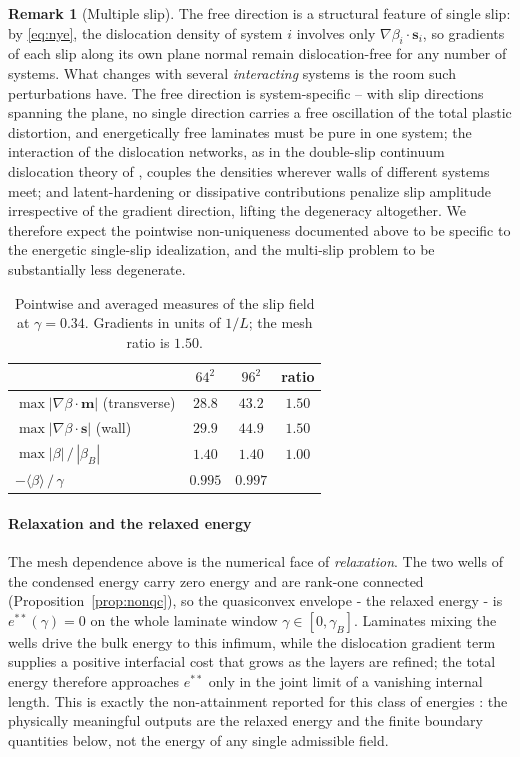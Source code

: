 \documentclass[12pt]{article}
\theoremstyle{plain}
\theoremstyle{definition}
\newtheorem{remark}[theorem]{Remark}
\newcommand{\bs}{\bm{s}}
\newcommand{\bmm}{\bm{m}}
\begin{document}
\begin{remark}[Multiple slip]
The free direction is a structural feature of single slip: by \eqref{eq:nye}, the
dislocation density of system $i$ involves only $\nabla\beta_i\cdot\bs_i$, so
gradients of each slip along its own plane normal remain dislocation-free for
any number of systems. What changes with several \emph{interacting} systems
is the room such perturbations have. The free direction is system-specific --
with slip directions spanning the plane, no single direction carries a free
oscillation of the total plastic distortion, and energetically free laminates
must be pure in one system; the interaction of the dislocation networks, as
in the double-slip continuum dislocation theory of \citet{le2008plane,le2009plane}, couples the densities wherever walls of different systems meet;
and latent-hardening or dissipative contributions penalize slip amplitude
irrespective of the gradient direction, lifting the degeneracy altogether. We
therefore expect the pointwise non-uniqueness documented above to be specific
to the energetic single-slip idealization, and the multi-slip problem to be
substantially less degenerate.
\end{remark}

\begin{table}[h]\centering\small
\caption{Pointwise and averaged measures of the slip field at $\gamma=0.34$.
Gradients in units of $1/L$; the mesh ratio is $1.50$.}
\label{tab:res-pointwise}
\begin{tabular}{lccc}
\hline
 & $64^2$ & $96^2$ & ratio \\
\hline
$\max|\nabla\beta\cdot\bmm|$ (transverse) & $28.8$ & $43.2$ & $1.50$ \\
$\max|\nabla\beta\cdot\bs|$ (wall)         & $29.9$ & $44.9$ & $1.50$ \\
$\max|\beta|\,/\,|\beta_B|$               & $1.40$ & $1.40$ & $1.00$ \\
$-\langle\beta\rangle\,/\,\gamma$          & $0.995$ & $0.997$ & \\
\hline
\end{tabular}
\end{table}

\paragraph{Relaxation and the relaxed energy}
The mesh dependence above is the numerical face of \emph{relaxation}. The two
wells of the condensed energy carry zero energy and are rank-one connected
(Proposition~\ref{prop:nonqc}), so the quasiconvex envelope - the relaxed
energy - is $e^{\ast\ast}(\gamma)=0$ on the whole laminate window $\gamma\in[0,\gamma_B]$.
Laminates mixing the wells drive the bulk energy to this infimum, while the
dislocation gradient term supplies a positive interfacial cost that grows as the
layers are refined; the total energy therefore approaches $e^{\ast\ast}$ only in
the joint limit of a vanishing internal length. This is exactly the
non-attainment reported for this class of energies
\citep{koster2015aformation}: the physically meaningful outputs are the
relaxed energy and the finite boundary quantities below, not the energy of any
single admissible field.
\end{document}
